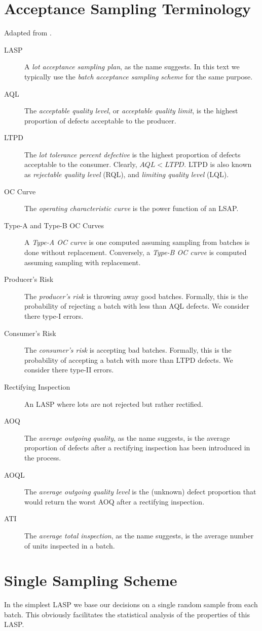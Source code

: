 \section{Acceptance Sampling Terminology}
Adapted from \cite{natrella_nist/sematech_2010}.
\begin{description}
\item [LASP] A \emph{lot acceptance sampling plan}, as the name suggests. In this text we typically use the \emph{batch acceptance sampling scheme} for the same purpose. 
\item [AQL] The \emph{acceptable quality level}, or \emph{acceptable quality limit}, is the highest proportion of defects acceptable to the producer. 
\item [LTPD] The \emph{lot tolerance percent defective} is the highest proportion of defects acceptable to the consumer. Clearly, $AQL<LTPD$. LTPD is also known as \emph{rejectable quality level} (RQL), and \emph{ limiting quality level} (LQL). 
\item [OC Curve] The \emph{operating characteristic curve} is the power function of an LSAP.
\item [Type-A and Type-B OC Curves] A \emph{Type-A OC curve} is one computed assuming sampling from batches is done without replacement. Conversely, a \emph{Type-B OC curve} is computed assuming sampling with replacement.
\item [Producer's Risk] The \emph{producer's risk} is throwing away good batches. Formally, this is the probability of rejecting a batch with less than AQL defects. We consider there type-I errors.
\item [Consumer's Risk] The \emph{consumer's risk} is accepting bad batches. Formally, this is the probability of accepting a batch with more than LTPD defects. We consider there type-II errors.
\item [Rectifying Inspection] An LASP where lots are not rejected but rather rectified. 
\item [AOQ] The \emph{average outgoing quality}, as the name suggests, is the average proportion of defects after a rectifying inspection has been introduced in the process. 
\item [AOQL] The \emph{average outgoing quality level} is the (unknown) defect proportion that would return the worst AOQ after a rectifying inspection.
\item [ATI] The \emph{average total inspection}, as the name suggests, is the average number of units inspected in a batch.
\end{description}



\section{Single Sampling Scheme}
In the simplest LASP we base our decisions on a single random sample from each batch.
This obviously facilitates the statistical analysis of the properties of this LASP.
